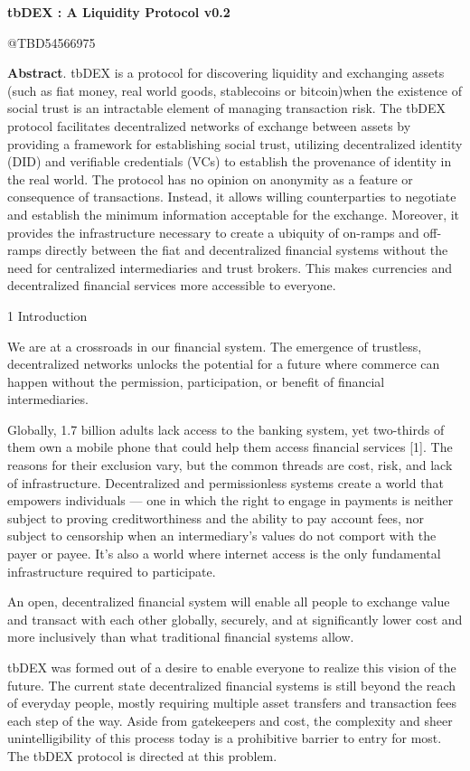 \documentclass[
]{article}
\author{}
\date{}
\begin{document}
\textbf{tbDEX : A Liquidity Protocol v0.2}

@TBD54566975

\textbf{Abstract}. tbDEX is a protocol for discovering liquidity and
exchanging assets (such as fiat money, real world goods, stablecoins or
bitcoin)when the existence of social trust is an intractable element of
managing transaction risk. The tbDEX protocol facilitates decentralized
networks of exchange between assets by providing a framework for
establishing social trust, utilizing decentralized identity (DID) and
verifiable credentials (VCs) to establish the provenance of identity in
the real world. The protocol has no opinion on anonymity as a feature or
consequence of transactions. Instead, it allows willing counterparties
to negotiate and establish the minimum information acceptable for the
exchange. Moreover, it provides the infrastructure necessary to create a
ubiquity of on-ramps and off-ramps directly between the fiat and
decentralized financial systems without the need for centralized
intermediaries and trust brokers. This makes currencies and
decentralized financial services more accessible to everyone.

1 Introduction

We are at a crossroads in our financial system. The emergence of
trustless, decentralized networks unlocks the potential for a future
where commerce can happen without the permission, participation, or
benefit of financial intermediaries.

Globally, 1.7 billion adults lack access to the banking system, yet
two-thirds of them own a mobile phone that could help them access
financial services {[}1{]}. The reasons for their exclusion vary, but
the common threads are cost, risk, and lack of infrastructure.
Decentralized and permissionless systems create a world that empowers
individuals --- one in which the right to engage in payments is neither
subject to proving creditworthiness and the ability to pay account fees,
nor subject to censorship when an intermediary's values do not comport
with the payer or payee. It's also a world where internet access is the
only fundamental infrastructure required to participate.

An open, decentralized financial system will enable all people to
exchange value and transact with each other globally, securely, and at
significantly lower cost and more inclusively than what traditional
financial systems allow.

tbDEX was formed out of a desire to enable everyone to realize this
vision of the future. The current state decentralized financial systems
is still beyond the reach of everyday people, mostly requiring multiple
asset transfers and transaction fees each step of the way. Aside from
gatekeepers and cost, the complexity and sheer unintelligibility of this
process today is a prohibitive barrier to entry for most. The tbDEX
protocol is directed at this problem.
\end{document}
